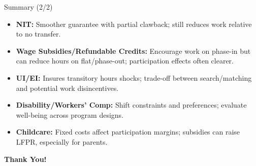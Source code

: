 \documentclass[aspectratio=169]{beamer}
\begin{document}
\begin{frame}{Summary (2/2)}
\transfade
\begin{itemize}
  \item \textbf{NIT:} Smoother guarantee with partial clawback; still reduces work relative to no transfer.
  \item \textbf{Wage Subsidies/Refundable Credits:} Encourage work on phase-in but can reduce hours on flat/phase-out; participation effects often clearer.
  \item \textbf{UI/EI:} Insures transitory hours shocks; trade-off between search/matching and potential work disincentives.
  \item \textbf{Disability/Workers’ Comp:} Shift constraints and preferences; evaluate well-being across program designs.
  \item \textbf{Childcare:} Fixed costs affect participation margins; subsidies can raise LFPR, especially for parents.
\end{itemize}
\end{frame}

\begin{frame}
\centering
\Huge{\textbf{Thank You!}} \\

\end{frame}
\end{document}
